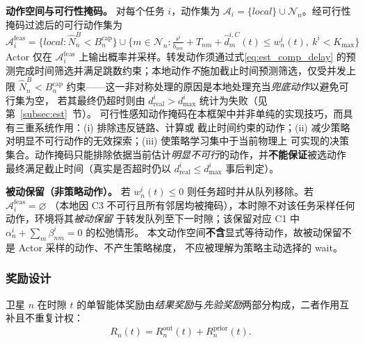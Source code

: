 \documentclass[a4paper,11pt]{article}
\begin{document}
\noindent\textbf{动作空间与可行性掩码。}
对每个任务 $i$，动作集为 $\mathcal{A}_i=\{local\}\cup\mathcal{N}_n$。经可行性掩码过滤后的可行动作集为
\begin{equation}
\mathcal{A}^{\mathrm{feas}}_i =
\big\{local : \hat{N}^B_n < B^{\mathrm{cap}}_n\big\}
\cup \Big\{m \in \mathcal{N}_n : \tfrac{s^i}{b_{nm}}+T_{nm}+\hat{d}^{i,C}_m(t) \le w^i_n(t),\ k^i < K_{\max}\Big\}
\label{eq:feasible_actions}
\end{equation}
Actor 仅在 $\mathcal{A}^{\mathrm{feas}}_i$ 上输出概率并采样。转发动作须通过式\eqref{eq:est_comp_delay}
的预测完成时间筛选并满足跳数约束；本地动作\emph{不}施加截止时间预测筛选，仅受并发上限
$\hat{N}^B_n<B^{\mathrm{cap}}_n$ 约束——这一非对称处理的原因是本地处理充当\emph{兜底动作}以避免可行集为空，
若其最终仍超时则由 $d^i_{\mathrm{real}}>d^i_{\max}$ 统计为失败（见第~\ref{subsec:est}~节）。
可行性感知动作掩码在本框架中并非单纯的实现技巧，而具有三重系统作用：(i) 排除违反链路、计算或
截止时间约束的动作；(ii) 减少策略对明显不可行动作的无效探索；(iii) 使策略学习集中于当前物理上
可实现的决策集合。动作掩码只能排除依据当前估计\emph{明显不可行}的动作，并\textbf{不能保证}被选动作
最终满足截止时间（真实是否超时仍以 $d^i_{\mathrm{real}}\le d^i_{\max}$ 事后判定）。

\noindent\textbf{被动保留（非策略动作）。}
若 $w^i_n(t)\le0$ 则任务超时并从队列移除。若 $\mathcal{A}^{\mathrm{feas}}_i=\varnothing$
（本地因 C3 不可行且所有邻居均被掩码），本时隙不对该任务采样任何动作，环境将其\emph{被动保留}
于转发队列至下一时隙；该保留对应 C1 中 $\alpha^i_n+\sum_m\beta^i_{nm}=0$ 的松弛情形。
本文动作空间\textbf{不含}显式等待动作，故被动保留不是 Actor 采样的动作、不产生策略梯度，
不应被理解为策略主动选择的 wait。

\subsubsection{奖励设计}
\label{subsec:reward}

卫星 $n$ 在时隙 $t$ 的单智能体奖励由\emph{结果奖励}与\emph{先验奖励}两部分构成，二者作用互补且不重复计权：
\begin{equation}
R_n(t) = R^{\mathrm{out}}_n(t) + R^{\mathrm{prior}}_n(t).
\label{eq:reward_total}
\end{equation}
\end{document}
